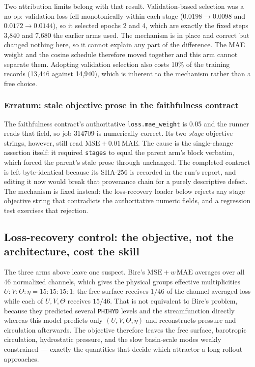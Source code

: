 \documentclass[11pt]{article}
\begin{document}
Two attribution limits belong with that result.  Validation-based selection was a no-op:
validation loss fell monotonically within each stage
(\(0.0198\!\rightarrow\!0.0098\) and \(0.0172\!\rightarrow\!0.0144\)), so it selected
epochs 2 and 4, which are exactly the fixed steps 3,840 and 7,680 the earlier arms used.
The mechanism is in place and correct but changed nothing here, so it cannot explain any
part of the difference.  The MAE weight and the cosine schedule therefore moved together
and this arm cannot separate them.  Adopting validation selection also costs 10\% of the
training records (13,446 against 14,940), which is inherent to the mechanism rather than
a free choice.

\subsubsection*{Erratum: stale objective prose in the faithfulness contract}

The faithfulness contract's authoritative \texttt{loss.mae\_weight} is 0.05 and the
runner reads that field, so job 314709 is numerically correct.  Its two \emph{stage}
objective strings, however, still read \(\mathrm{MSE}+0.01\,\mathrm{MAE}\).  The cause is
the single-change assertion itself: it required \texttt{stages} to equal the parent arm's
block verbatim, which forced the parent's stale prose through unchanged.  The completed
contract is left byte-identical because its SHA-256 is recorded in the run's report, and
editing it now would break that provenance chain for a purely descriptive defect.  The
mechanism is fixed instead: the loss-recovery loader below rejects any stage objective
string that contradicts the authoritative numeric fields, and a regression test exercises
that rejection.

\subsection{Loss-recovery control: the objective, not the architecture, cost the
skill}

The three arms above leave one suspect.  Bire's \(\mathrm{MSE}+w\,\mathrm{MAE}\)
averages over all 46 normalized channels, which gives the physical groups effective
multiplicities \(U:V:\Theta:\eta = 15:15:15:1\): the free surface receives \(1/46\) of
the channel-averaged loss while each of \(U,V,\Theta\) receives \(15/46\).  That is not
equivalent to Bire's problem, because they predicted several \texttt{PHIHYD} levels and
the streamfunction directly whereas this model predicts only \((U,V,\Theta,\eta)\) and
reconstructs pressure and circulation afterwards.  The objective therefore leaves the
free surface, barotropic circulation, hydrostatic pressure, and the slow basin-scale
modes weakly constrained --- exactly the quantities that decide which attractor a long
rollout approaches.
\end{document}
